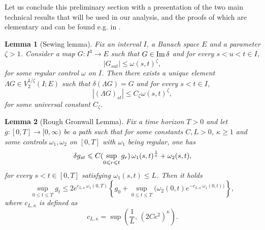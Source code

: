 \documentclass[11pt,reqno,oneside]{amsart}
\numberwithin{equation}{section}
\newtheorem{lemma}{Lemma}
\newcommand{\hb}[1]{\textcolor{blue}{#1}}
\begin{document}
Let us conclude this preliminary section with a presentation of the two main technical results that will be used in our analysis, and the proofs of which are elementary and can be found e.g. in \cite{conservation-laws}. 

\begin{lemma}[Sewing lemma]
  \label{lemma-lambda}Fix an interval $I$, a Banach space $E$ and a parameter
  $\zeta > 1$. Consider a map $G : I^3 \to E$ such that $ G \in \mathrm{Im}
  \hspace{0.17em} \delta$ and for every $s < u < t \in I$,
  \[ |G_{s u t} | \leqslant \omega (s, t)^{\zeta}, \]
  for some regular control $\omega$ on $I$. Then there exists a unique element
  $\Lambda G \in V_2^{1 / \zeta} (I ; E)$ such that $\delta (\Lambda G) = G$
  and for every $s < t \in I$,
  \begin{equation}
    | (\Lambda G)_{s t} | \leqslant C_{\zeta} \omega (s, t)^{\zeta}
    \label{contraction},
  \end{equation}
  for some universal constant $C_{\zeta}$.
\end{lemma}

\begin{lemma}[Rough Gronwall Lemma]
  \label{lemma:basic-rough-gronwall}Fix a time horizon $T > 0$ and let $g :
  [0, T] \to [0, \infty)$ be a path such that for some constants $C, L > 0$,
  $\kappa \geqslant 1$ and some controls $\omega_1, \omega_2$ on $[0, T]$ with $\omega_1$ being regular, one has
  \begin{equation}
    \label{eq:a-priori-g} \delta g_{st} \leqslant C (\sup_{0 \leqslant r
    \leqslant t} g_r)  \hspace{0.17em} \omega_1 (s, t)^{\frac{1}{\kappa}} +
    \omega_2 (s, t),
  \end{equation}
  for every $s < t \in [0, T]$ satisfying $\omega_1 (s, t) \leqslant L$. Then
  it holds
\begin{equation*}
\sup_{0 \leqslant t \leqslant T} g_t \leqslant 
2 e^{c_{L,\kappa}\, \omega_1 (0, T)} 
\left\{ g_0 + \sup_{0 \leqslant t \leqslant T} (\omega_2 (0, t) 
e^{- c_{L,\kappa}\,   \omega_1 (0, t) )} \right\},
\end{equation*}
 where $c_{L,\kappa}$ is defined as
  \begin{equation}
    \label{eq:def-c-kappa-L} 
    c_{L,\kappa}  = \sup \left( \frac{1}{L}, \, (2 Ce^2)^{\kappa} \right) .
  \end{equation}

\end{lemma}
\end{document}
